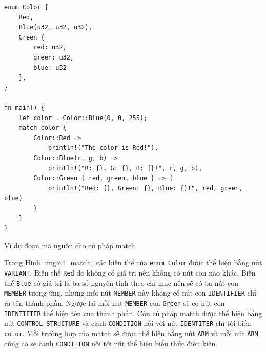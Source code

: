 \begin{listing}[H]
\begin{verbatim}
enum Color {
    Red,
    Blue(u32, u32, u32),
    Green {
        red: u32,
        green: u32,
        blue: u32
    },
}

fn main() {
    let color = Color::Blue(0, 0, 255);
    match color {
        Color::Red =>
            println!("The color is Red!"),
        Color::Blue(r, g, b) =>
            println!("R: {}, G: {}, B: {}!", r, g, b),
        Color::Green { red, green, blue } => {
            println!("Red: {}, Green: {}, Blue: {}!", red, green, blue)
        }
    }
}
\end{verbatim}
\caption{Ví dụ đoạn mã nguồn cho cú pháp match.}
\label{code:c4_match}
\end{listing}

Trong Hình \ref{img:c4_match}, các biến thể của \texttt{enum Color} được thể hiện bằng nút \texttt{VARIANT}.
Biến thể \texttt{Red} do không có giá trị nên không có nút con nào khác.
Biến thể \texttt{Blue} có giá trị là ba số nguyên tính theo chỉ mục nên sẽ có ba nút con \texttt{MEMBER} tương ứng, nhưng mỗi nút \texttt{MEMBER} này không có nút con \texttt{IDENTIFIER} chỉ ra tên thành phần.
Ngược lại mỗi nút \texttt{MEMBER} của \texttt{Green} sẽ có nút con \texttt{IDENTIFIER} thể hiện tên của thành phần.
Còn cú pháp match được thể hiện bằng nút \texttt{CONTROL STRUCTURE} và cạnh \texttt{CONDITION} nối với nút \texttt{IDENTITER} chỉ tới biến \texttt{color}.
Mỗi trường hợp của match sẽ được thể hiện bằng nút \texttt{ARM} và mỗi nút \texttt{ARM} cũng có sẽ cạnh \texttt{CONDITION} nối tới nút thể hiện biểu thức điều kiện.

